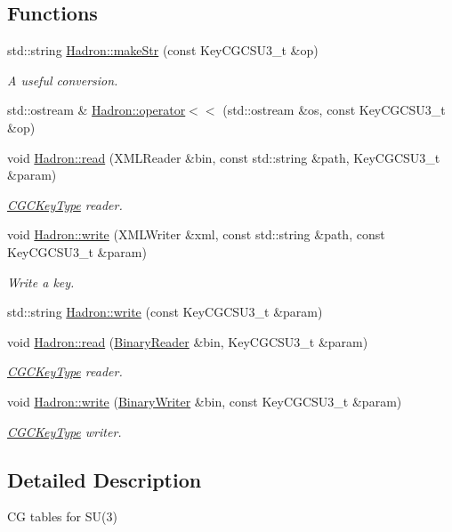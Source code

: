 \subsection*{Functions}
\begin{DoxyCompactItemize}
\item 
std\+::string \mbox{\hyperlink{namespaceHadron_a15300efff4b5c521fc84ba05f78c8710}{Hadron\+::make\+Str}} (const Key\+C\+G\+C\+S\+U3\+\_\+t \&op)
\begin{DoxyCompactList}\small\item\em A useful conversion. \end{DoxyCompactList}\item 
std\+::ostream \& \mbox{\hyperlink{namespaceHadron_a7351a4ec8398497cfa72ae6326e7d88c}{Hadron\+::operator$<$$<$}} (std\+::ostream \&os, const Key\+C\+G\+C\+S\+U3\+\_\+t \&op)
\item 
void \mbox{\hyperlink{namespaceHadron_a32f04cfa14604e9b40e037d78c0fad86}{Hadron\+::read}} (X\+M\+L\+Reader \&bin, const std\+::string \&path, Key\+C\+G\+C\+S\+U3\+\_\+t \&param)
\begin{DoxyCompactList}\small\item\em \mbox{\hyperlink{structHadron_1_1CGCKeyType}{C\+G\+C\+Key\+Type}} reader. \end{DoxyCompactList}\item 
void \mbox{\hyperlink{namespaceHadron_a1df6238e1c6eca70a3e05655f2680904}{Hadron\+::write}} (X\+M\+L\+Writer \&xml, const std\+::string \&path, const Key\+C\+G\+C\+S\+U3\+\_\+t \&param)
\begin{DoxyCompactList}\small\item\em Write a key. \end{DoxyCompactList}\item 
std\+::string \mbox{\hyperlink{namespaceHadron_a4af69bc389ee44d25d1f3efa30042e4c}{Hadron\+::write}} (const Key\+C\+G\+C\+S\+U3\+\_\+t \&param)
\item 
void \mbox{\hyperlink{namespaceHadron_ad89b4230ad913b777ca725473df40d15}{Hadron\+::read}} (\mbox{\hyperlink{classADATIO_1_1BinaryReader}{Binary\+Reader}} \&bin, Key\+C\+G\+C\+S\+U3\+\_\+t \&param)
\begin{DoxyCompactList}\small\item\em \mbox{\hyperlink{structHadron_1_1CGCKeyType}{C\+G\+C\+Key\+Type}} reader. \end{DoxyCompactList}\item 
void \mbox{\hyperlink{namespaceHadron_af206eaa349ec42352cb0a106dfd89c5b}{Hadron\+::write}} (\mbox{\hyperlink{classADATIO_1_1BinaryWriter}{Binary\+Writer}} \&bin, const Key\+C\+G\+C\+S\+U3\+\_\+t \&param)
\begin{DoxyCompactList}\small\item\em \mbox{\hyperlink{structHadron_1_1CGCKeyType}{C\+G\+C\+Key\+Type}} writer. \end{DoxyCompactList}\end{DoxyCompactItemize}


\subsection{Detailed Description}
CG tables for S\+U(3) 

